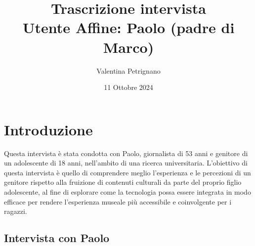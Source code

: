 \documentclass{article}
\title{\textbf{Trascrizione intervista}\\ Utente Affine: Paolo (padre di Marco)}
\author{Valentina Petrignano}
\date{11 Ottobre 2024}
\begin{document}
\maketitle

\section{Introduzione}
Questa intervista è stata condotta con Paolo, giornalista di 53 anni e genitore di un adolescente di 18 anni, nell'ambito di una ricerca universitaria. L’obiettivo di questa intervista è quello di comprendere meglio l’esperienza e le percezioni di un genitore rispetto alla fruizione di contenuti culturali da parte del proprio figlio adolescente, al fine di esplorare come la tecnologia possa essere integrata in modo efficace per rendere l’esperienza museale più accessibile e coinvolgente per i ragazzi.

\subsection{\textcolor{subsectioncolor}{Intervista con Paolo}}
\end{document}
